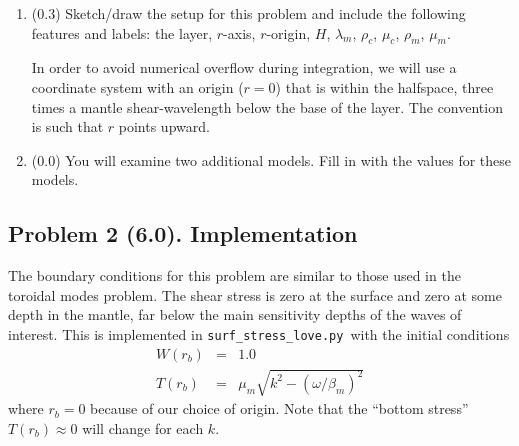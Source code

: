 \documentclass[11pt,titlepage,fleqn]{article}
\newcommand{\tfileBB}{{\tt surf\_stress\_love.py}}
\begin{document}
\begin{enumerate}
\begin{enumerate}
\end{enumerate}

\label{prob:model1}


\item (0.3) Sketch/draw the setup for this problem and include the following features and labels: the layer, $r$-axis, $r$-origin, $H$, $\lambda_m$, $\rho_c$, $\mu_c$, $\rho_m$, $\mu_m$.

In order to avoid numerical overflow during integration, we will use a coordinate system with an origin ($r = 0$) that is within the halfspace, three times a mantle shear-wavelength below the base of the layer. The convention is such that $r$ points upward.

\label{prob:setup}


\item (0.0) You will examine two additional models. Fill in  with the values for these models.

\end{enumerate}


\subsection*{Problem 2 (6.0). Implementation}

The boundary conditions for this problem are similar to those used in the toroidal modes problem. The shear stress is zero at the surface and zero at some depth in the mantle, far below the main sensitivity depths of the waves of interest. This is implemented in \tfileBB\ with the initial conditions
%
\begin{eqnarray}
W(r_b) &=& 1.0
\label{Wbase}
\\
T(r_b) &=& \mu_m \sqrt{k^2 - (\omega/\beta_m)^2}
\label{Tbase}
\end{eqnarray}
%
where $r_b = 0$ because of our choice of origin. Note that the ``bottom stress'' $T(r_b) \approx 0$ will change for each $k$.
%
%

\end{document}
